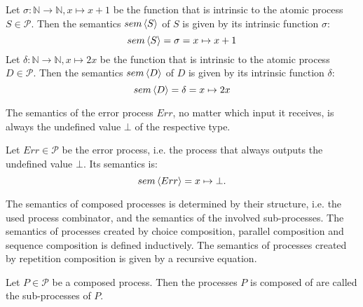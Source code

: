 \begin{example}
  \label{exp:sem_atomic}
  Let $\sigma \colon \mathbb{N} \to \mathbb{N}, x \mapsto x+1$ be the function that is intrinsic to the atomic process $S \in \mathcal{P}$. Then the semantics $sem \left\langle S \right\rangle$ of $S$ is given by its intrinsic function $\sigma$:
  \begin{equation*}
    sem \left\langle S \right\rangle = \sigma = x \mapsto x+1
  \end{equation*}
  Let $\delta \colon \mathbb{N} \to \mathbb{N}, x \mapsto 2x$ be the function that is intrinsic to the atomic process $D \in \mathcal{P}$. Then the semantics $sem \left\langle D \right\rangle$ of $D$ is given by its intrinsic function $\delta$:
  \begin{equation*}
    sem \left\langle D \right\rangle = \delta = x \mapsto 2x
  \end{equation*}
\end{example}


The semantics of the error process $Err$, no matter which input it receives, is always the undefined value $\bot$ of the respective type. 
\begin{definition}
\label{def:sem_err}
Let $Err \in \mathcal{P}$ be the error process, i.e. the process that always outputs the undefined value $\bot$. Its semantics is:
  \begin{equation*}
    \label{eqn:sem_error}
    sem \left\langle Err \right\rangle = x \mapsto \bot.
  \end{equation*}
  \vspace*{-0.5em}
  \hfill\qedsymbol
\end{definition}

The semantics of composed processes is determined by their structure, i.e. the used process combinator, and the semantics of the involved sub-processes. The semantics of processes created by choice composition, parallel composition and sequence composition is defined inductively. The semantics of processes created by repetition composition is given by a recursive equation.

\begin{definition}
Let $P \in \mathcal{P}$ be a composed process. Then the processes $P$ is composed of are called the sub-processes of $P$.

\hfill\qedsymbol
\end{definition}


